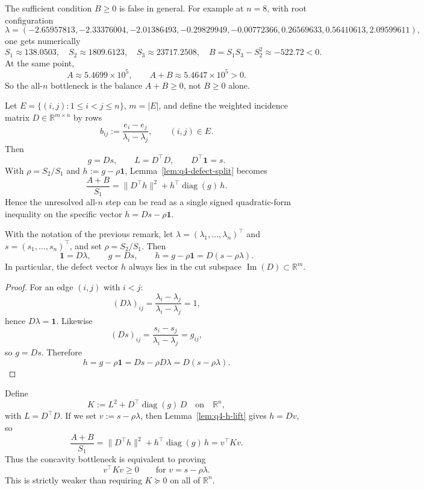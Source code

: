 \begin{remark}
The sufficient condition $B\ge 0$ is false in general.
For example at $n=8$, with root configuration
\[
\lambda=(-2.65957813,-2.33376004,-2.01386493,-0.29829949,-0.00772366,0.26569633,0.56410613,2.09599611),
\]
one gets numerically
\[
S_1\approx 138.0503,\quad
S_2\approx 1809.6123,\quad
S_3\approx 23717.2508,\quad
B=S_1S_3-S_2^2\approx -522.72<0.
\]
At the same point,
\[
A\approx 5.4699\times 10^5,
\qquad
A+B\approx 5.4647\times 10^5>0.
\]
So the all-$n$ bottleneck is the balance $A+B\ge 0$, not $B\ge 0$ alone.
\end{remark}

\begin{remark}
Let $E=\{(i,j):1\le i<j\le n\}$, $m=|E|$, and define
the weighted incidence matrix $D\in\mathbb R^{m\times n}$ by rows
\[
b_{ij}:=\frac{e_i-e_j}{\lambda_i-\lambda_j},\qquad (i,j)\in E.
\]
Then
\[
g=Ds,\qquad L=D^\top D,\qquad D^\top\mathbf 1=s.
\]
With $\rho=S_2/S_1$ and $h:=g-\rho\mathbf 1$, Lemma~\ref{lem:q4-defect-split} becomes
\[
\frac{A+B}{S_1}
=
\|D^\top h\|^2 + h^\top\!\operatorname{diag}(g)\,h.
\]
Hence the unresolved all-$n$ step can be read as a single signed
quadratic-form inequality on the specific vector $h=Ds-\rho\mathbf 1$.
\end{remark}

\begin{lemma}\label{lem:q4-h-lift}
With the notation of the previous remark, let $\lambda=(\lambda_1,\dots,\lambda_n)^\top$
and $s=(s_1,\dots,s_n)^\top$, and set $\rho=S_2/S_1$.
Then
\[
\mathbf 1 = D\lambda,\qquad
g=Ds,\qquad
h=g-\rho\mathbf 1 = D(s-\rho\lambda).
\]
In particular, the defect vector $h$ always lies in the cut subspace
$\operatorname{Im}(D)\subset\mathbb R^m$.
\end{lemma}

\begin{proof}
For an edge $(i,j)$ with $i<j$:
\[
(D\lambda)_{ij}=\frac{\lambda_i-\lambda_j}{\lambda_i-\lambda_j}=1,
\]
hence $D\lambda=\mathbf 1$.
Likewise
\[
(Ds)_{ij}=\frac{s_i-s_j}{\lambda_i-\lambda_j}=g_{ij},
\]
so $g=Ds$.
Therefore
\[
h=g-\rho\mathbf 1
=Ds-\rho D\lambda
=D(s-\rho\lambda).
\]
\end{proof}

\begin{remark}
Define
\[
K:=L^2 + D^\top\!\operatorname{diag}(g)\,D
\quad\text{on}\quad \mathbb R^n,
\]
with $L=D^\top D$.
If we set $v:=s-\rho\lambda$, then Lemma~\ref{lem:q4-h-lift} gives $h=Dv$, so
\[
\frac{A+B}{S_1}
=\|D^\top h\|^2+h^\top\!\operatorname{diag}(g)\,h
=v^\top K v.
\]
Thus the concavity bottleneck is equivalent to proving
\[
v^\top K v\ge 0\qquad\text{for }v=s-\rho\lambda.
\]
This is strictly weaker than requiring $K\succeq 0$ on all of $\mathbb R^n$.
\end{remark}

